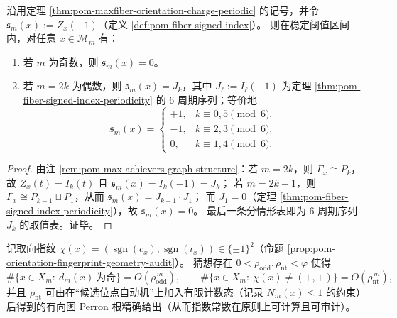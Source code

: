 \begin{corollary}\label{cor:pom-maxfiber-signed-index-extinction-periodic}
沿用定理 \ref{thm:pom-maxfiber-orientation-charge-periodic} 的记号，并令 \(\mathfrak{s}_m(x):=Z_x(-1)\)（定义 \ref{def:pom-fiber-signed-index}）。
则在稳定阈值区间内，对任意 \(x\in\mathcal{M}_m\) 有：
\begin{enumerate}
\normalfont
  \item 若 \(m\) 为奇数，则 \(\mathfrak{s}_m(x)=0\)。
  \item 若 \(m=2k\) 为偶数，则 \(\mathfrak{s}_m(x)=J_k\)，其中 \(J_\ell:=I_\ell(-1)\) 为定理 \ref{thm:pom-fiber-signed-index-periodicity} 的 \(6\) 周期序列；等价地
  \[
  \mathfrak{s}_m(x)=
  \begin{cases}
  +1, & k\equiv 0,5\pmod 6,\\
  -1, & k\equiv 2,3\pmod 6,\\
  0, & k\equiv 1,4\pmod 6.
  \end{cases}
  \]
\end{enumerate}
\end{corollary}
\begin{proof}
由注 \ref{rem:pom-max-achievers-graph-structure}：若 \(m=2k\)，则 \(\Gamma_x\cong P_k\)，故 \(Z_x(t)=I_k(t)\) 且 \(\mathfrak{s}_m(x)=I_k(-1)=J_k\)；
若 \(m=2k+1\)，则 \(\Gamma_x\cong P_{k-1}\sqcup P_1\)，从而
\(
\mathfrak{s}_m(x)=J_{k-1}\cdot J_1
\)；
而 \(J_1=0\)（定理 \ref{thm:pom-fiber-signed-index-periodicity}），故 \(\mathfrak{s}_m(x)=0\)。
最后一条分情形表即为 \(6\) 周期序列 \(J_k\) 的取值表。证毕。
\end{proof}

\begin{conjecture}\label{conj:pom-nontrivial-orientation-sector-perron-root}
记取向指纹 \(\chi(x)=(\operatorname{sgn}(c_x),\operatorname{sgn}(\iota_x))\in\{\pm 1\}^2\)（命题 \ref{prop:pom-orientation-fingerprint-geometry-audit}）。
猜想存在 \(0<\rho_{\mathrm{odd}},\rho_{\mathrm{nt}}<\varphi\) 使得
\[
\#\{x\in X_m:\ d_m(x)\ \text{为奇}\}=O(\rho_{\mathrm{odd}}^{\,m}),
\qquad
\#\{x\in X_m:\ \chi(x)\neq(+,+)\}=O(\rho_{\mathrm{nt}}^{\,m}),
\]
并且 \(\rho_{\mathrm{nt}}\) 可由在“候选位点自动机”上加入有限计数态（记录 \(N_m(x)\le 1\) 的约束）后得到的有向图 Perron 根精确给出（从而指数常数在原则上可计算且可审计）。
\end{conjecture}

\endinput
